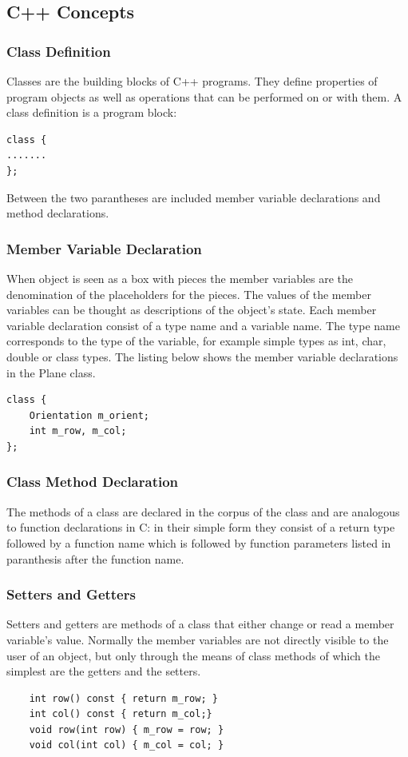 \documentclass{article}
\begin{document}
\subsection {C++ Concepts}

\subsubsection {Class Definition}
Classes are the building blocks of C++ programs. They define properties of program objects as well as operations that can be performed on or with them. A class definition is a program block:
\begin{lstlisting}
class {
.......
};
\end{lstlisting}
Between the two parantheses  are included member variable declarations and method declarations. 

\subsubsection {Member Variable Declaration}
When object is seen as a box with pieces the member variables are the denomination of the placeholders for the pieces. The values of the member variables can be thought as descriptions of the object's state. Each member variable declaration consist of a type name and a variable name. The type name corresponds to the type of the variable, for example simple types as int, char, double or class types.
The listing below shows the member variable declarations in the Plane class.
\begin{lstlisting}
class {
    Orientation m_orient;
    int m_row, m_col;
};
\end{lstlisting}

\subsubsection {Class Method Declaration}
The methods of a class are declared in the corpus of the class and are analogous to function declarations in C: in their simple form they consist of a return type followed by a function name which is followed by function parameters listed in paranthesis after the function name.

\subsubsection {Setters and Getters}
Setters and getters are methods of a class that either change or read a member variable's value. Normally the member variables are not directly visible to the user of an object, but only through the means of class methods of which the simplest are the getters and the setters.
\begin{lstlisting}
    int row() const { return m_row; }
    int col() const { return m_col;}
    void row(int row) { m_row = row; }
    void col(int col) { m_col = col; }
\end{lstlisting}
\end{document}
